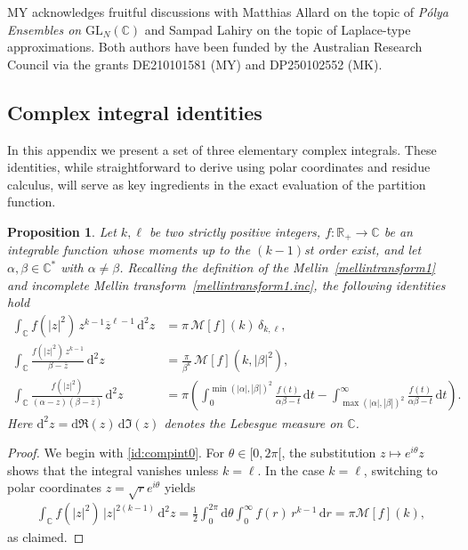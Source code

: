 \documentclass[pdflatex,sn-mathphys-num]{sn-jnl}
\theoremstyle{thmstyleone}
\newtheorem{proposition}[theorem]{Proposition}
\numberwithin{equation}{section}
\newcommand{\R}{\mathbb{R}}
\newcommand{\C}{\mathbb{C}}
\begin{document}
\backmatter


MY acknowledges fruitful discussions with Matthias Allard on the topic of \textit{Pólya Ensembles on} $\mathrm{GL}_{N}(\C)$ and Sampad Lahiry on the topic of Laplace-type approximations. Both authors have been funded by the Australian Research Council via the grants DE210101581 (MY) and DP250102552 (MK).



\begin{appendices}

\section{Complex integral identities}\label{secA1}

In this appendix we present a set of three elementary complex integrals. These identities, while straightforward to derive using polar coordinates and residue calculus, will serve as key ingredients in the exact evaluation of the partition function.
 
\begin{proposition}
Let $k,\ell$ be two strictly positive integers, $f:\R_{+}\to\C$ be an integrable function whose moments up to the $(k-1)$st order exist, and let $ \alpha, \beta \in \C^* $ with $ \alpha \neq \beta $. Recalling the definition of the Mellin~\eqref{mellintransform1} and incomplete Mellin transform~\eqref{mellintransform1.inc}, the following identities hold
\begin{align}
\int_{\C} f(|z|^2)\, z^{k-1} \overline{z}^{\ell-1} \, \mathrm{d}^2 z 
&= \pi\, \mathcal{M}[f](k) \, \delta_{k,\ell}, \label{id:compint0} \\
\int_{\C} \frac{f(|z|^2)\, z^{k-1}}{\beta - \overline{z}} \, \mathrm{d}^2 z 
&= \frac{\pi}{\beta^k} \, \mathcal{M}[f](k, |\beta|^2), \label{id:compint1} \\
\int_{\C} \frac{f(|z|^2)}{(\alpha - z)(\beta - \overline{z})} \, \mathrm{d}^2 z 
&= \pi \left( \int_{0}^{\min(|\alpha|, |\beta|)^2} \frac{f(t)}{\alpha\beta - t} \, \mathrm{d}t
- \int_{\max(|\alpha|, |\beta|)^2}^{\infty} \frac{f(t)}{\alpha\beta - t} \, \mathrm{d}t \right). \label{id:compint2}
\end{align}
Here $\mathrm{d}^{2}z = \mathrm{d}\Re(z)\, \mathrm{d}\Im(z)$ denotes the Lebesgue measure on $\C$.
\end{proposition}
\begin{proof}
We begin with \eqref{id:compint0}. For $ \theta \in [0, 2\pi[ $, the substitution $ z \mapsto e^{i\theta} z $ shows that the integral vanishes unless $ k = \ell $. In the case $ k = \ell $, switching to polar coordinates $ z = \sqrt{r} e^{i\theta} $ yields
\begin{align}
    \int_{\C} f(|z|^2)\, |z|^{2(k-1)} \, \mathrm{d}^2 z = \frac{1}{2}\int_{0}^{2\pi} \mathrm{d}\theta \int_{0}^{\infty} f(r)\, r^{k-1} \, \mathrm{d}r = \pi \mathcal{M}[f](k),
\end{align}
as claimed.
 

\end{proof}
\end{appendices}
\end{document}
